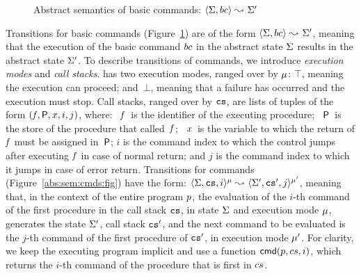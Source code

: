 \begin{figure}[t!]
{\begin{mathpar}
\end{mathpar}}
\vspace*{-0.5cm}
\caption{Abstract semantics of basic commands: {\small $\absbsemrule{\absstate, \bcmd}{\absstate'}{}$}}\label{abs:sem:bcmds:fig}
\vspace*{-0.45cm}
\end{figure}

Transitions for \jsil
basic commands (Figure~\ref{abs:sem:bcmds:fig}) are of the form 
$\absbsemrule{\absstate, \bcmd}{\absstate'}{}$, meaning that the execution of the basic command 
$\bcmd$ in the abstract state $\absstate$ results in the abstract state $\absstate'$. 
%
To describe transitions of \jsil commands, we introduce \emph{execution modes} and 
\emph{call stacks}.  \jsil has two execution modes, ranged over by $\mode$: 
$\top$, meaning the execution can proceed; and~$\bot$, meaning that a failure 
has occurred and the execution must stop. Call stacks, ranged over by $\abscs$, are lists of tuples of the form $(\pid, \absstore, \jvar, i, j)$, where: 
~$\pid$~is the identifier of the executing procedure;
~$\absstore$~is the store of the procedure that called~$\pid$; 
~$\jvar$~is the variable to which the return of $\pid$ must be assigned in~$\absstore$; 
 $i$ is the command index to which the control jumps after executing $\pid$ in case of normal return; 
and  $j$ is the command index to which it jumps in case of error return. 
Transitions for \jsil commands (Figure~\ref{abs:sem:cmds:fig}) have the form:  $\abssemrule{\absstate, \abscs, i}{\absstate', \abscs', j}{\mode}{\mode'}{}$, 
meaning that, in the context of the entire program $\prog$, the evaluation of the $i$-th command of the first procedure in the 
call stack $\abscs$, in state $\absstate$ and execution mode $\mode$, generates 
the state $\absstate'$, call stack $\abscs'$,  and the next command to be evaluated is the $j$-th command of the first procedure 
of $\abscs'$, in execution mode $\mode'$. 
For clarity, we keep the executing program implicit and use a function $\ccmd{\prog, \cs, i}$, which 
returns the $i$-th command of the procedure that is first in $\cs$. %

